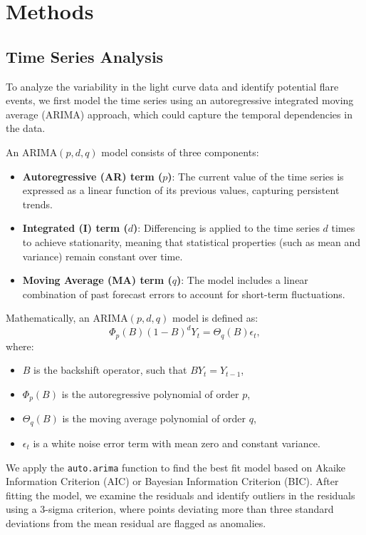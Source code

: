 \documentclass[
]{article}
\begin{document}
\section{Methods}\label{methods}

\subsection{Time Series Analysis}\label{time-series-analysis}

To analyze the variability in the light curve data and identify potential flare events, we first model the time series using an autoregressive integrated moving average (ARIMA) approach, which could capture the temporal dependencies in the data.

An ARIMA\((p,d,q)\) model consists of three components:

\begin{itemize}
    \item \textbf{Autoregressive (AR) term ($p$)}: The current value of the time series is expressed as a linear function of its previous values, capturing persistent trends.
    \item \textbf{Integrated (I) term ($d$)}: Differencing is applied to the time series $d$ times to achieve stationarity, meaning that statistical properties (such as mean and variance) remain constant over time.
    \item \textbf{Moving Average (MA) term ($q$)}: The model includes a linear combination of past forecast errors to account for short-term fluctuations.
\end{itemize}

Mathematically, an ARIMA\((p,d,q)\) model is defined as:
\begin{equation}
    \Phi_p(B)(1 - B)^d Y_t = \Theta_q(B) \epsilon_t,
\end{equation}
where:

\begin{itemize}
    \item $B$ is the backshift operator, such that $B Y_t = Y_{t-1}$,
    \item $\Phi_p(B)$ is the autoregressive polynomial of order $p$,
    \item $\Theta_q(B)$ is the moving average polynomial of order $q$,
    \item $\epsilon_t$ is a white noise error term with mean zero and constant variance.
\end{itemize}

We apply the \texttt{auto.arima} function to find the best fit model based on Akaike Information Criterion (AIC) or Bayesian Information Criterion (BIC). After fitting the model, we examine the residuals and identify outliers in the residuals using a 3-sigma criterion, where points deviating more than three standard deviations from the mean residual are flagged as anomalies.
\end{document}
